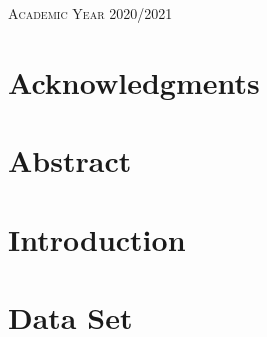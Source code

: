 \documentclass[a4paper,12pt,twoside]{report}
\begin{document}
\begin{onehalfspace}
\begin{titlepage}
\begin{center}
\textsc{Academic Year 2020/2021}\\[0.25cm] %

\vfill

\end{center}
\end{titlepage}

\clearpage
	\fancyhf{}
	\rhead{\thepage}
\chapter*{Acknowledgments}
\label{c:ack}





\clearpage
	\fancyhf{}
	\rhead{\thepage}
	\lhead{\textbf{ \nouppercase{\leftmark}} }
\tableofcontents

\clearpage
{}
\listoffigures

\clearpage
{}
\listoftables

\clearpage
	\fancyhf{}
	\rhead{\thepage}
\chapter*{Abstract}
\label{c:abstract}



\clearpage
	\fancyhf{}
	\rhead{\thepage}
	\lhead{\nouppercase{\leftmark}}
\chapter{Introduction}
\label{c:intro}




\clearpage
\chapter{Data Set}
\label{c:dataset}



\clearpage

\end{onehalfspace}
\end{document}
